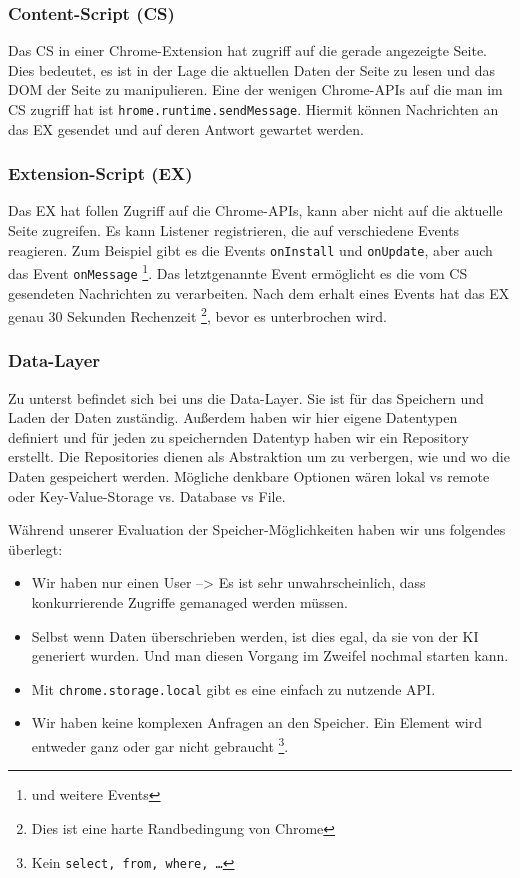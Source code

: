   \subsubsection{Content-Script (CS)}

  Das CS in einer Chrome-Extension hat zugriff auf die gerade angezeigte Seite. Dies bedeutet, es ist in der Lage die aktuellen Daten der Seite zu lesen und das DOM der Seite zu manipulieren. Eine der wenigen Chrome-APIs auf die man im CS zugriff hat ist \texttt{hrome.runtime.sendMessage}. Hiermit können Nachrichten an das EX gesendet und auf deren Antwort gewartet werden.

  \subsubsection{Extension-Script (EX)}
  Das EX hat follen Zugriff auf die Chrome-APIs, kann aber nicht auf die aktuelle Seite zugreifen. Es kann Listener registrieren, die auf verschiedene Events reagieren. Zum Beispiel gibt es die Events \texttt{onInstall} und \texttt{onUpdate}, aber auch das Event \texttt{onMessage} \footnote{und weitere Events}. Das letztgenannte Event ermöglicht es die vom CS gesendeten Nachrichten zu verarbeiten. Nach dem erhalt eines Events hat das EX genau 30 Sekunden Rechenzeit \footnote{Dies ist eine harte Randbedingung von Chrome}, bevor es unterbrochen wird.

  \subsubsection{Data-Layer}

  Zu unterst befindet sich bei uns die Data-Layer. Sie ist für das Speichern und Laden der Daten zuständig. Außerdem haben wir hier eigene Datentypen definiert und für jeden zu speichernden Datentyp haben wir ein Repository erstellt. Die Repositories dienen als Abstraktion um zu verbergen, wie und wo die Daten gespeichert werden. Mögliche denkbare Optionen wären lokal vs remote oder Key-Value-Storage vs. Database vs File.

  Während unserer Evaluation der Speicher-Möglichkeiten haben wir uns folgendes überlegt:

  \begin{itemize}
    \item Wir haben nur einen User --> Es ist sehr unwahrscheinlich, dass konkurrierende Zugriffe gemanaged werden müssen.
    \item Selbst wenn Daten überschrieben werden, ist dies egal, da sie von der KI generiert wurden. Und man diesen Vorgang im Zweifel nochmal starten kann.
    \item Mit \texttt{chrome.storage.local} gibt es eine einfach zu nutzende API.
    \item Wir haben keine komplexen Anfragen an den Speicher. Ein Element wird entweder ganz oder gar nicht gebraucht \footnote{Kein \texttt{select, from, where, \dots}}.
  \end{itemize}
  
